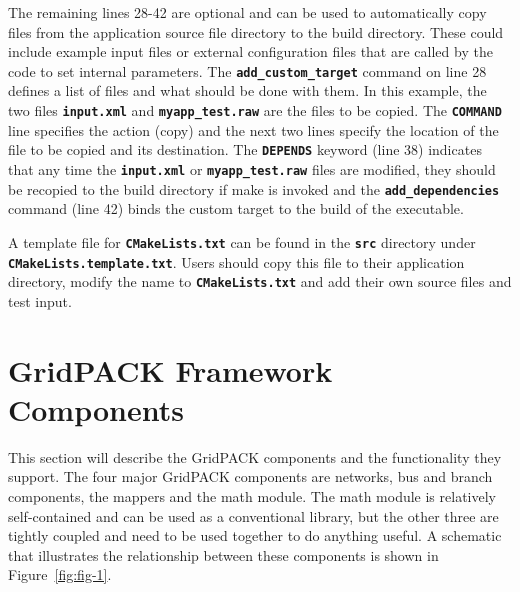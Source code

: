 \documentclass[12pt]{report} %
\begin{document}
The remaining lines 28-42 are optional and can be used to automatically copy files from the application source file directory to the build directory. These could include example input files or external configuration files that are called by the code to set internal parameters. The \texttt{\textbf{add\_custom\_target}} command on line 28 defines a list of files and what should be done with them. In this example, the two files \texttt{\textbf{input.xml}} and \texttt{\textbf{myapp\_test.raw}} are the files to be copied. The \texttt{\textbf{COMMAND}} line specifies the action (copy) and the next two lines specify the location of the file to be copied and its destination. The \texttt{\textbf{DEPENDS}} keyword (line 38) indicates that any time the \texttt{\textbf{input.xml}} or \texttt{\textbf{myapp\_test.raw}} files are modified, they should be recopied to the build directory if make is invoked and the \texttt{\textbf{add\_dependencies}} command (line 42) binds the custom target to the build of the executable.

A template file for \texttt{\textbf{CMakeLists.txt}} can be found in the \texttt{\textbf{src}} directory under \texttt{\textbf{CMakeLists.template.txt}}. Users should copy this file to their application directory, modify the name to \texttt{\textbf{CMakeLists.txt}} and add their own source files and test input.

\chapter{GridPACK Framework Components}

This section will describe the GridPACK components and the functionality they support. The four major GridPACK components are networks, bus and branch components, the mappers and the math module. The math module is relatively self-contained and can be used as a conventional library, but the other three are tightly coupled and need to be used together to do anything useful. A schematic that illustrates the relationship between these components is shown in Figure~\ref{fig:fig-1}.
\end{document}
